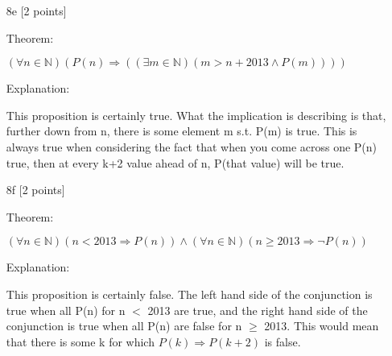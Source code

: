 \documentclass[11pt,letterpaper]{article}
\begin{document}
\begin{enumerate}
\item[8e] [2 points]

Theorem:

$(\forall n \in \mathbb{N}) (P(n) \Rightarrow ((\exists m \in \mathbb{N}) (m > n + 2013 \wedge P(m))))$

Explanation:

This proposition is certainly true. What the implication is describing is that, further down from n, there is some element m s.t. P(m) is true. This is always true when considering the fact that when you come across one P(n) true, then at every k+2 value ahead of n, P(that value) will be true.

\item[8f] [2 points]

Theorem:

$(\forall n \in \mathbb{N}) (n<2013 \Rightarrow P(n)) \wedge (\forall n \in \mathbb{N}) (n \geq 2013 \Rightarrow \neg P(n))$

Explanation:

This proposition is certainly false. The left hand side of the conjunction is true when all P(n) for n $<$ 2013 are true, and the right hand side of the conjunction is true when all P(n) are false for n $\geq$ 2013. This would mean that there is some k for which $P(k) \Rightarrow P(k+2)$ is false. 
\end{enumerate}
\end{document}

